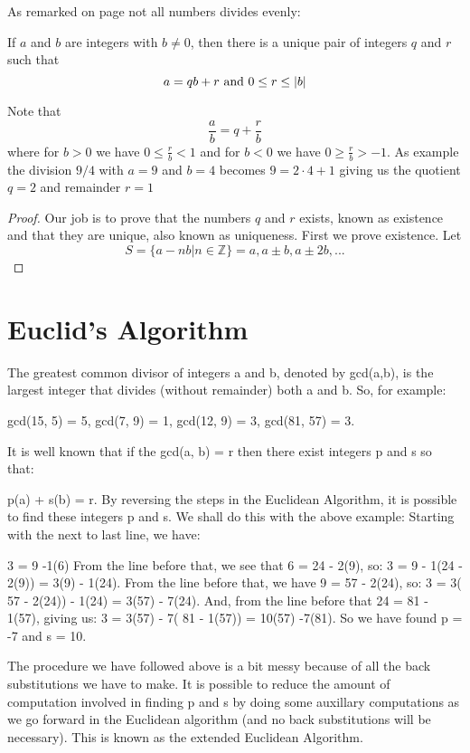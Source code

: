 As remarked on page \pageref{remainder} not all numbers divides evenly:
\begin{proposition}\label{division_algorithm}
If $a$ and $b$ are integers with $b\neq0$, then there is a unique pair of integers $q$ and $r$ such that
\[
a = qb+r \textnormal{ and } 0 \leq r \leq |b|
\]
\end{proposition}
Note that
\[
\frac{a}{b} = q + \frac{r}{b}
\]
where for $b>0$ we have $0 \leq \frac{r}{b} < 1$ and for $b<0$ we have $0 \geq \frac{r}{b} > -1$. As example the division $9/4$ with $a=9$ and $b=4$ becomes $9=2\cdot4 + 1$ giving us the quotient $q=2$ and remainder $r=1$
\begin{proof}
Our job is to prove that the numbers $q$ and $r$ exists, known as existence and that they are unique, also known as uniqueness. First we prove existence. Let
\[
S = \{a-nb|n \in \mathbb{Z}\} = {a,a \pm b,a \pm 2b,...}
\]
\end{proof}

\section{Euclid's Algorithm}
The greatest common divisor of integers a and b, denoted by gcd(a,b), is the largest integer that divides (without remainder) both a and b. So, for example:

gcd(15, 5) = 5,	gcd(7, 9) = 1,	gcd(12, 9) = 3,	gcd(81, 57) = 3.

It is well known that if the gcd(a, b) = r then there exist integers p and s so that:

p(a) + s(b) = r.
By reversing the steps in the Euclidean Algorithm, it is possible to find these integers p and s. We shall do this with the above example:
Starting with the next to last line, we have:

3 = 9 -1(6)
From the line before that, we see that 6 = 24 - 2(9), so:
3 = 9 - 1(24 - 2(9)) = 3(9) - 1(24).
From the line before that, we have 9 = 57 - 2(24), so:
3 = 3( 57 - 2(24)) - 1(24) = 3(57) - 7(24).
And, from the line before that 24 = 81 - 1(57), giving us:
3 = 3(57) - 7( 81 - 1(57)) = 10(57) -7(81).
So we have found p = -7 and s = 10.

The procedure we have followed above is a bit messy because of all the back substitutions we have to make. It is possible to reduce the amount of computation involved in finding p and s by doing some auxillary computations as we go forward in the Euclidean algorithm (and no back substitutions will be necessary). This is known as the extended Euclidean Algorithm.

